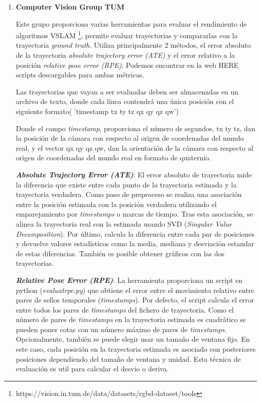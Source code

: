 \begin {enumerate}
\item\textbf{Computer Vision Group TUM}

Este grupo proporciona varias herramientas para evaluar el rendimiento de algoritmos VSLAM \footnote{https://vision.in.tum.de/data/datasets/rgbd-dataset/tools}, permite evaluar trayectorias y compararlas con la trayectoria \textit{ground truth}.\cite{sturm12iros}
Utiliza principalmente 2 métodos, el error absoluto de la trayectoria \textit{absolute trajectory error (ATE)} y el error relativo a la posición \textit{relative pose error (RPE)}. Podemos encontrar en la web HERE scripts descargables para ambas métricas.

Las trayectorias que vayan a ser evaluadas deben ser almacenadas en un archivo de texto, donde cada línea contendrá una única posición con el siguiente formato( 'timestamp tx ty tz qx qy qz qw')

Donde el campo \textit{timestamp}, proporciona el número de segundos, tx ty tz, dan la posición de la cámara con respecto al origen de coordenadas del mundo real, y el vector qx qy qz qw, dan la orientación de la cámara con respecto al origen de coordenadas del mundo real en formato de quaternio. 


 \textbf{\textit{Absolute Trajectory Error (ATE)}}:
 El error absoluto de trayectoria mide la diferencia que existe entre cada punto de la trayectoria estimada y la trayectoria verdadera. Como paso de preproceso se realiza una asociación entre la posición estimada con la posición verdadera utilizando el emparejamiento por \textit{timestamps} o marcas de tiempo. Tras esta asociación, se alinea la trayectoria real con la estimada usando SVD (\textit{Singular Value Decomposition}). Por último, calcula la diferencia entre cada par de posiciones y devuelve valores estadísticos como la media, mediana y desviación estandar de estas diferencias. También es posible obtener gráficos con las dos trayectorias.

\textbf{\textit{Relative Pose Error (RPE)}}: 
La herramienta proporciona un script en python (\textit{evaluatrpe.py}) que obtiene el error entre el movimiento relativo entre pares de sellos temporales (\textit{timestamps}). Por defecto, el script calcula el error entre todos los pares de \textit{timestamps} del fichero de trayectoria. Como el número de pares de \textit{timestamps} en la trayectoria estimada es cuadrático se pueden poner cotas con un número máximo de pares de \textit{timestamps}. Opcionalmente, también se puede elegir usar un tamaño de ventana fijo. En este caso, cada posición en la trayectoria estimada es asociado con posteriores posiciones dependiendo del tamaño de ventana y unidad. Esta técnica de evaluación es util para calcular el desvio o deriva.




\end{enumerate}
